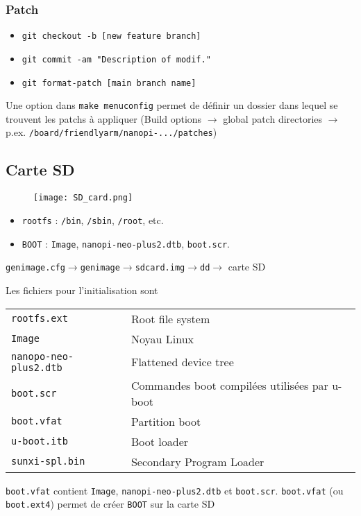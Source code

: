 \subsubsection{Patch}
\begin{itemize}
    \item \verb+git checkout -b [new feature branch]+
    \item \verb+git commit -am "Description of modif."+
    \item \verb+git format-patch [main branch name]+
\end{itemize}
Une option dans \verb+make menuconfig+ permet de définir un dossier dans lequel se trouvent les patchs à appliquer (Build options $\rightarrow$ global patch directories $\rightarrow$ p.ex. \verb+/board/friendlyarm/nanopi-.../patches+)
\subsection{Carte SD}
\begin{figure}[H]
    \centering
    \texttt{[image: SD\_card.png]}
\end{figure}
\begin{itemize}
    \item \verb+rootfs+ : \verb+/bin+, \verb+/sbin+, \verb+/root+, etc.
    \item \verb+BOOT+ : \verb+Image+, \verb+nanopi-neo-plus2.dtb+, \verb+boot.scr+.
\end{itemize}
\begin{center}
\verb!genimage.cfg!$\rightarrow$\verb!genimage!$\rightarrow$\verb!sdcard.img!$\rightarrow$\verb!dd!$\rightarrow$ carte SD
\end{center}
Les fichiers pour l'initialisation sont\\
\begin{table}[H]
\begin{tabular}{lp{4cm}}
\verb!rootfs.ext! & Root file system\\
\verb!Image! & Noyau Linux\\
\verb!nanopo-neo-plus2.dtb! & Flattened device tree\\
\verb!boot.scr! & Commandes boot compilées utilisées par u-boot\\
\verb!boot.vfat! & Partition boot\\
\verb!u-boot.itb! & Boot loader\\
\verb!sunxi-spl.bin! & Secondary Program Loader
\end{tabular}
\end{table}
\verb!boot.vfat! contient \verb!Image!, \verb!nanopi-neo-plus2.dtb! et \verb!boot.scr!. \verb!boot.vfat! (ou \verb!boot.ext4!) permet de créer \verb!BOOT! sur la carte SD
